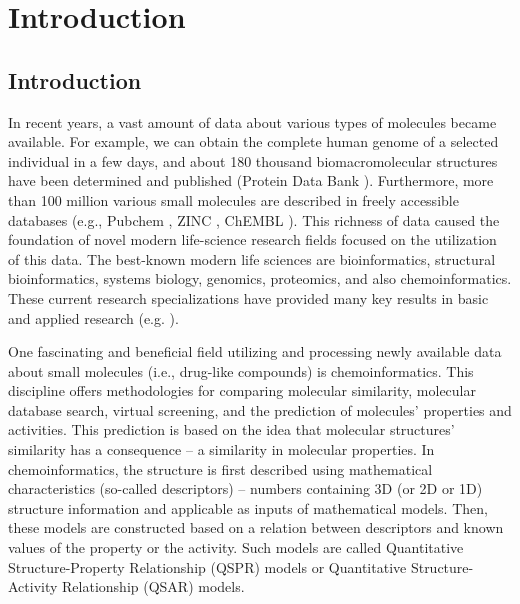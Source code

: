 \part{Introduction}

\chapter{Introduction}

In recent years, a vast amount of data about various types of molecules became
available. For example, we can obtain the complete human genome of a selected
individual in a few days, and about 180 thousand biomacromolecular structures
have been determined and published (Protein Data Bank \cite{Berman2014}).
Furthermore, more
than 100 million various small molecules are described in freely accessible
databases (e.g., Pubchem \cite{pubchem}, ZINC \cite{Irwin2012},
ChEMBL \cite{Bento2013}). This richness of data caused
the foundation of novel modern life-science research fields focused on the
utilization of this data. The best-known modern life sciences are
bioinformatics, structural bioinformatics, systems biology, genomics,
proteomics, and also chemoinformatics. These current research specializations
have provided many key results in basic and applied research (e.g.
\cite{Paulsen2015, Cao2013, Prota2013, Lu2005, Puente2011, Nayal2006, Xie2009}
).

One fascinating and beneficial field utilizing and processing newly available
data about small molecules (i.e., drug-like compounds) is chemoinformatics.
This discipline offers me\-tho\-do\-lo\-gies for comparing molecular similarity,
molecular database search, virtual screening, and the prediction of molecules'
properties and activities. This prediction is based on the idea that molecular
structures' similarity has a consequence -- a similarity in molecular
properties. In chemoinformatics, the structure is first described using
mathematical characteristics (so-called descriptors) -- numbers containing 3D
(or 2D or 1D) structure information and applicable as inputs of mathematical
models. Then, these models are constructed based on a relation between
descriptors and known values of the property or the activity. Such models are
called Quantitative Stru\-cture-Property Relationship (QSPR) models or
Quantitative Structure-Activity Relationship (QSAR) models.

